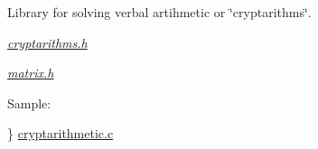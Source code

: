 Library for solving verbal artihmetic or \char`\"{}cryptarithms\char`\"{}.
\begin{DoxyEnumerate}
\item {\itshape \mbox{\hyperlink{cryptarithms_8h}{cryptarithms.\+h}}} 
\item {\itshape \mbox{\hyperlink{matrix_8h}{matrix.\+h}}} 
\end{DoxyEnumerate}

Sample\+: 
\begin{DoxyCodeInclude}{0}
\end{DoxyCodeInclude}
\} \mbox{\hyperlink{cryptarithmetic_8c}{cryptarithmetic.\+c}} 